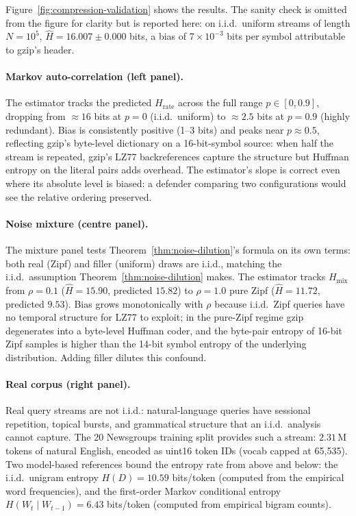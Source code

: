 \documentclass[conference]{IEEEtran}
\theoremstyle{definition}
\theoremstyle{plain}
\theoremstyle{remark}
\begin{document}
Figure~\ref{fig:compression-validation} shows the results.  The
sanity check is omitted from the figure for clarity but is reported
here: on i.i.d.\ uniform streams of length $N = 10^5$, $\hat H = 16.007 \pm 0.000$ bits, a bias of $7 \times 10^{-3}$ bits per
symbol attributable to gzip's header.

\paragraph{Markov auto-correlation (left panel).}
The estimator tracks the predicted $H_{\mathrm{rate}}$ across the
full range $p \in [0, 0.9]$, dropping from $\approx 16$ bits at
$p = 0$ (i.i.d.\ uniform) to $\approx 2.5$ bits at $p = 0.9$
(highly redundant).  Bias is consistently positive (1--3 bits) and
peaks near $p \approx 0.5$, reflecting gzip's byte-level dictionary
on a 16-bit-symbol source: when half the stream is repeated, gzip's
LZ77 backreferences capture the structure but Huffman entropy on
the literal pairs adds overhead.  The estimator's slope is correct
even where its absolute level is biased: a defender comparing two
configurations would see the relative ordering preserved.

\paragraph{Noise mixture (centre panel).}
The mixture panel tests Theorem~\ref{thm:noise-dilution}'s
formula on its own terms: both real (Zipf) and filler (uniform)
draws are i.i.d., matching the i.i.d.\ assumption Theorem~\ref{thm:noise-dilution}
makes.  The estimator tracks $H_{\mathrm{mix}}$ from $\rho = 0.1$
($\hat H = 15.90$, predicted $15.82$) to $\rho = 1.0$ pure Zipf
($\hat H = 11.72$, predicted $9.53$).  Bias grows monotonically
with $\rho$ because i.i.d.\ Zipf queries have no temporal structure
for LZ77 to exploit; in the pure-Zipf regime gzip degenerates into
a byte-level Huffman coder, and the byte-pair entropy of 16-bit
Zipf samples is higher than the 14-bit symbol entropy of the
underlying distribution.  Adding filler dilutes this confound.

\paragraph{Real corpus (right panel).}
Real query streams are not i.i.d.: natural-language queries have
sessional repetition, topical bursts, and grammatical structure
that an i.i.d.\ analysis cannot capture.  The 20 Newsgroups
training split provides such a stream: $2.31\,\text{M}$ tokens of
natural English, encoded as uint16 token IDs (vocab capped at
65{,}535).  Two model-based references bound the entropy rate from
above and below: the i.i.d.\ unigram entropy
$H(D) = 10.59$ bits/token (computed from the empirical word
frequencies), and the first-order Markov conditional entropy
$H(W_t \mid W_{t-1}) = 6.43$ bits/token (computed from empirical
bigram counts).
\end{document}

